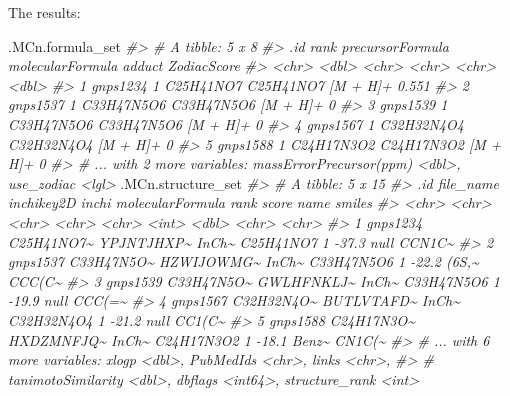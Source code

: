 \documentclass[]{tufte-handout}
\newenvironment{Shaded}{}{}
\newcommand{\CommentTok}[1]{\textcolor[rgb]{0.38,0.63,0.69}{\textit{#1}}}
\newcommand{\NormalTok}[1]{#1}
\begin{document}
The results:

\begin{Shaded}
\begin{Highlighting}[]
\NormalTok{.MCn.formula\_set}
\CommentTok{\#\textgreater{} \# A tibble: 5 x 8}
\CommentTok{\#\textgreater{}   .id       rank precursorFormula molecularFormula adduct   ZodiacScore}
\CommentTok{\#\textgreater{}   \textless{}chr\textgreater{}    \textless{}dbl\textgreater{} \textless{}chr\textgreater{}            \textless{}chr\textgreater{}            \textless{}chr\textgreater{}          \textless{}dbl\textgreater{}}
\CommentTok{\#\textgreater{} 1 gnps1234     1 C25H41NO7        C25H41NO7        [M + H]+       0.551}
\CommentTok{\#\textgreater{} 2 gnps1537     1 C33H47N5O6       C33H47N5O6       [M + H]+       0    }
\CommentTok{\#\textgreater{} 3 gnps1539     1 C33H47N5O6       C33H47N5O6       [M + H]+       0    }
\CommentTok{\#\textgreater{} 4 gnps1567     1 C32H32N4O4       C32H32N4O4       [M + H]+       0    }
\CommentTok{\#\textgreater{} 5 gnps1588     1 C24H17N3O2       C24H17N3O2       [M + H]+       0    }
\CommentTok{\#\textgreater{} \# ... with 2 more variables: \textasciigrave{}massErrorPrecursor(ppm)\textasciigrave{} \textless{}dbl\textgreater{}, use\_zodiac \textless{}lgl\textgreater{}}
\NormalTok{.MCn.structure\_set}
\CommentTok{\#\textgreater{} \# A tibble: 5 x 15}
\CommentTok{\#\textgreater{}   .id      file\_name  inchikey2D inchi molecularFormula  rank score name  smiles}
\CommentTok{\#\textgreater{}   \textless{}chr\textgreater{}    \textless{}chr\textgreater{}      \textless{}chr\textgreater{}      \textless{}chr\textgreater{} \textless{}chr\textgreater{}            \textless{}int\textgreater{} \textless{}dbl\textgreater{} \textless{}chr\textgreater{} \textless{}chr\textgreater{} }
\CommentTok{\#\textgreater{} 1 gnps1234 C25H41NO7\textasciitilde{} YPJNTJHXP\textasciitilde{} InCh\textasciitilde{} C25H41NO7            1 {-}37.3 null  CCN1C\textasciitilde{}}
\CommentTok{\#\textgreater{} 2 gnps1537 C33H47N5O\textasciitilde{} HZWIJOWMG\textasciitilde{} InCh\textasciitilde{} C33H47N5O6           1 {-}22.2 (6S,\textasciitilde{} CCC(C\textasciitilde{}}
\CommentTok{\#\textgreater{} 3 gnps1539 C33H47N5O\textasciitilde{} GWLHFNKLJ\textasciitilde{} InCh\textasciitilde{} C33H47N5O6           1 {-}19.9 null  CCC(=\textasciitilde{}}
\CommentTok{\#\textgreater{} 4 gnps1567 C32H32N4O\textasciitilde{} BUTLVTAFD\textasciitilde{} InCh\textasciitilde{} C32H32N4O4           1 {-}21.2 null  CC1(C\textasciitilde{}}
\CommentTok{\#\textgreater{} 5 gnps1588 C24H17N3O\textasciitilde{} HXDZMNFJQ\textasciitilde{} InCh\textasciitilde{} C24H17N3O2           1 {-}18.1 Benz\textasciitilde{} CN1C(\textasciitilde{}}
\CommentTok{\#\textgreater{} \# ... with 6 more variables: xlogp \textless{}dbl\textgreater{}, PubMedIds \textless{}chr\textgreater{}, links \textless{}chr\textgreater{},}
\CommentTok{\#\textgreater{} \#   tanimotoSimilarity \textless{}dbl\textgreater{}, dbflags \textless{}int64\textgreater{}, structure\_rank \textless{}int\textgreater{}}
\end{Highlighting}
\end{Shaded}
\end{document}
